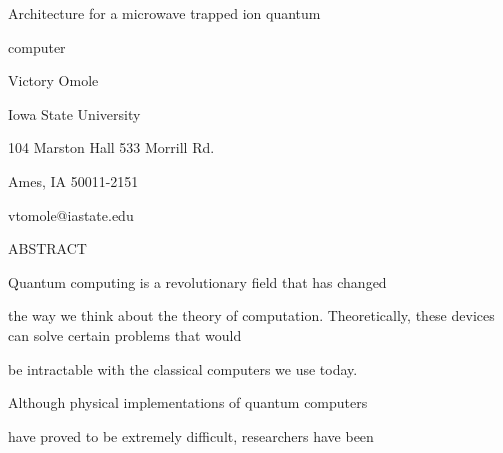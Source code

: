 \documentclass[a4paper,portrait,12pt]{article}
\begin{document}
\begin{flushleft}
Architecture for a microwave trapped ion quantum
\end{flushleft}


\begin{flushleft}
computer
\end{flushleft}


\begin{flushleft}
Victory Omole
\end{flushleft}


\begin{flushleft}
Iowa State University
\end{flushleft}


\begin{flushleft}
104 Marston Hall 533 Morrill Rd.
\end{flushleft}


\begin{flushleft}
Ames, IA 50011-2151
\end{flushleft}





\begin{flushleft}
vtomole@iastate.edu
\end{flushleft}





\begin{flushleft}
ABSTRACT
\end{flushleft}


\begin{flushleft}
Quantum computing is a revolutionary field that has changed
\end{flushleft}


\begin{flushleft}
the way we think about the theory of computation. Theoretically, these devices can solve certain problems that would
\end{flushleft}


\begin{flushleft}
be intractable with the classical computers we use today.
\end{flushleft}


\begin{flushleft}
Although physical implementations of quantum computers
\end{flushleft}


\begin{flushleft}
have proved to be extremely difficult, researchers have been
\end{flushleft}
\end{document}
